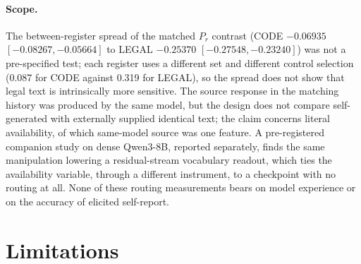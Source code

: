 \documentclass[10pt,a4paper,twocolumn]{article}
\begin{document}
\paragraph{Scope.}
The between-register spread of the matched \(P_r\) contrast (CODE
\(-0.06935\) \([-0.08267,-0.05664]\) to LEGAL \(-0.25370\)
\([-0.27548,-0.23240]\)) was not a pre-specified test; each register uses a
different set and different control selection (0.087 for CODE against 0.319
for LEGAL), so the spread does not show that legal text is intrinsically more
sensitive. The source response in the matching history was produced by the
same model, but the design does not compare self-generated with externally
supplied identical text; the claim concerns literal availability, of which
same-model source was one feature. A pre-registered companion study on dense
Qwen3-8B, reported separately, finds the same manipulation lowering a
residual-stream vocabulary readout, which ties the availability variable,
through a different instrument, to a checkpoint with no routing at all. None
of these routing measurements bears on model experience or on the accuracy of
elicited self-report.

\section{Limitations}\label{sec:limitations}
\end{document}
